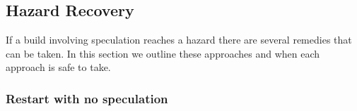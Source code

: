 \begin{comment}

\subsection{Additional commands have no effect}
\label{sec:proof:additional}

Given a script with no hazards when executed sequentially, we can show that speculating unnecessary commands will not affect the build's output. %

Proof by induction.

Let us assume we have a build $A$ which has no hazards when executed sequentially.

Base case:  Build $A$ has 1 command $c$.  Let us assume we have a command $d$ that does not write to any file read or written by $c$.  By this definition of $d$, it is obvious that $d$ running before or
concurrently with $c$ as part of build $A$, will not affect the files written by $c$ and therefore will not affect the output of $A$.

Inductive case: Let us assume the above claim is true for a build with $n$ commands.  Let us show the claim is true for a build of $n+1$ commands.

Let $A$ have $n+1$ command.  From the inductive hypothesis we know the output of the first $n$ commands is unchanged.  And, we know that $c$ does not write to any file read or written by command $n+1$.  And, because the build has no hazards, all files read by $n+1$ were written to before $n+1$ ran, so the output files of $n+1$ remain unchanged as well.  Therefore, the output of $A$ remained unaffected by $c$.
\end{comment}

\subsection{Hazard Recovery}
\label{sec:proof:classify_hazard}

If a build involving speculation reaches a hazard there are several remedies that can be taken. In this section we outline these approaches and when each approach is safe to take.

\subsubsection{Restart with no speculation}
\label{sec:proof:restart_no_speculation}

